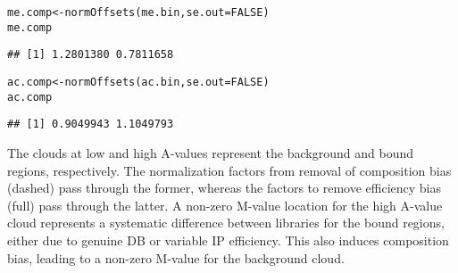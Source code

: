 \documentclass{report}\usepackage[]{graphicx}\usepackage[usenames,dvipsnames]{color}
\newcommand{\hlnum}[1]{\textcolor[rgb]{0.816,0.125,0.439}{#1}}%
\newcommand{\hlstd}[1]{\textcolor[rgb]{0.251,0.251,0.251}{#1}}%
\newcommand{\hlkwb}[1]{\textcolor[rgb]{0,0,0}{#1}}%
\newcommand{\hlkwc}[1]{\textcolor[rgb]{0.251,0.251,0.251}{#1}}%
\newcommand{\hlkwd}[1]{\textcolor[rgb]{0.878,0.439,0.125}{#1}}%
\newenvironment{knitrout}{}{} %
\begin{document}
\begin{knitrout}
\color{fgcolor}\begin{kframe}
\begin{alltt}
\hlstd{me.comp} \hlkwb{<-} \hlkwd{normOffsets}\hlstd{(me.bin,} \hlkwc{se.out}\hlstd{=}\hlnum{FALSE}\hlstd{)}
\hlstd{me.comp}
\end{alltt}
\begin{verbatim}
## [1] 1.2801380 0.7811658
\end{verbatim}
\begin{alltt}
\hlstd{ac.comp} \hlkwb{<-} \hlkwd{normOffsets}\hlstd{(ac.bin,} \hlkwc{se.out}\hlstd{=}\hlnum{FALSE}\hlstd{)}
\hlstd{ac.comp}
\end{alltt}
\begin{verbatim}
## [1] 0.9049943 1.1049793
\end{verbatim}
\end{kframe}
\end{knitrout}

The clouds at low and high A-values represent the background and bound regions, respectively.
The normalization factors from removal of composition bias (dashed) pass through the former, whereas the factors to remove efficiency bias (full) pass through the latter.
A non-zero M-value location for the high A-value cloud represents a systematic difference between libraries for the bound regions, either due to genuine DB or variable IP efficiency. 
This also induces composition bias, leading to a non-zero M-value for the background cloud.
\end{document}
